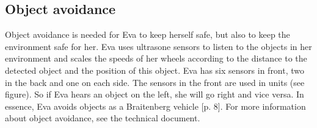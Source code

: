 \documentclass[project_eva.tex]{subfiles}
\begin{document}
\subsection*{Object avoidance}
Object avoidance is needed for Eva to keep herself safe, but also to keep the environment safe for her. Eva uses ultrasone 
sensors to listen to the objects in her environment and scales the speeds of her wheels according to the distance to the 
detected object and the position of this object. Eva has six sensors in front, two in the back and one on each side. The sensors in the front are used in units (see figure). So if Eva hears an object on the left, she will go right and vice versa. In essence, Eva avoids objects as a Braitenberg vehicle 
\cite{braitenberg} [p. 8]. For more information about object avoidance, see the 
technical document.
\end{document}
